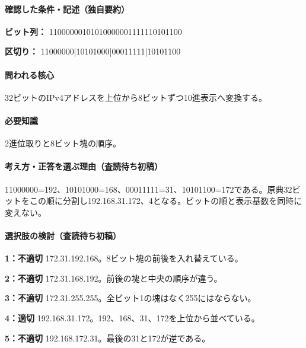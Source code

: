 \paragraph{確認した条件・記述（独自要約）}\mbox{}\par

\noindent\textbf{ビット列：} 11000000101010000001111110101100\par

\noindent\textbf{区切り：} 11000000|10101000|00011111|10101100\par

\paragraph{問われる核心} 32ビットのIPv4アドレスを上位から8ビットずつ10進表示へ変換する。

\paragraph{必要知識} 2進位取りと8ビット塊の順序。

\paragraph{考え方・正答を選ぶ理由（査読待ち初稿）} 11000000=\allowbreak{}192、10101000=\allowbreak{}168、00011111=\allowbreak{}31、10101100=\allowbreak{}172である。原典32ビットをこの順に分割し192.168.31.172、4となる。ビットの順と表示基数を同時に変えない。

\paragraph{選択肢の検討（査読待ち初稿）}\mbox{}\par

\noindent\textbf{1：不適切} 172.31.192.168。8ビット塊の前後を入れ替えている。\par

\noindent\textbf{2：不適切} 172.31.168.192。前後の塊と中央の順序が違う。\par

\noindent\textbf{3：不適切} 172.31.255.255。全ビット1の塊はなく255にはならない。\par

\noindent\textbf{4：適切} 192.168.31.172。192、168、31、172を上位から並べている。\par

\noindent\textbf{5：不適切} 192.168.172.31。最後の31と172が逆である。\par

